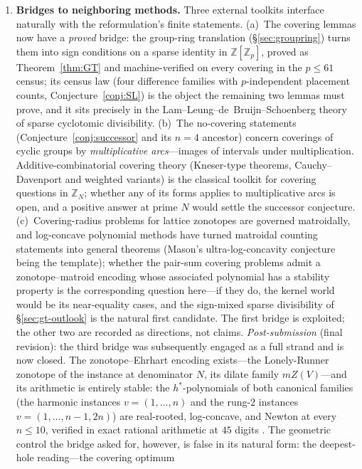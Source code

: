 \documentclass[11pt,a4paper]{article}
\numberwithin{equation}{section}
\theoremstyle{plain}
\theoremstyle{plain}
\theoremstyle{definition}
\theoremstyle{remark}
\newcommand{\Z}{\mathbb{Z}}
\begin{document}
\begin{enumerate}[leftmargin=1.7em,itemsep=4pt]
\item \textbf{Bridges to neighboring methods.} Three external toolkits
  interface naturally with the reformulation's finite statements.
  (a)~The covering lemmas now have a \emph{proved} bridge: the group-ring
  translation (\S\ref{sec:groupring}) turns them into sign conditions on
  a sparse identity in $\Z[\Z_p]$, proved as Theorem~\ref{thm:GT} and
  machine-verified on every covering in the $p\le61$ census; its census
  law (four difference families with $p$-independent placement counts,
  Conjecture~\ref{conj:SL}) is the object the remaining two lemmas must
  prove, and it sits precisely in the Lam--Leung--de~Bruijn--Schoenberg
  theory of sparse cyclotomic divisibility.
  (b)~The no-covering
  statements (Conjecture~\ref{conj:successor} and its $n=4$ ancestor)
  concern coverings of cyclic groups by \emph{multiplicative
  arcs}---images of intervals under multiplication. Additive-combinatorial
  covering theory (Kneser-type theorems, Cauchy--Davenport and weighted
  variants) is the classical toolkit for covering questions in $\Z_N$;
  whether any of its forms applies to multiplicative arcs is open, and a
  positive answer at prime $N$ would settle the successor conjecture.
  (c)~Covering-radius problems for lattice zonotopes are governed
  matroidally, and log-concave polynomial methods have turned matroidal
  counting statements into general theorems (Mason's ultra-log-concavity
  conjecture being the template); whether the pair-sum covering problems
  admit a zonotope--matroid encoding whose associated polynomial has a
  stability property is the corresponding question here---if they do, the
  kernel world would be its near-equality cases, and the sign-mixed
  sparse divisibility of \S\ref{sec:gt-outlook} is the natural first
  candidate. The first bridge is exploited; the other two are recorded as
  directions, not claims. \emph{Post-submission} (final revision): the
  third bridge was subsequently engaged as a full strand and is now
  closed. The zonotope--Ehrhart encoding exists---the Lonely-Runner
  zonotope of the instance at denominator $N$, its dilate family
  $mZ(V)$---and its arithmetic is entirely stable: the $h^*$-polynomials
  of both canonical families (the harmonic instances $v=(1,\dots,n)$ and
  the rung-$2$ instances $v=(1,\dots,n{-}1,2n)$) are real-rooted,
  log-concave, and Newton at every $n\le 10$, verified in exact
  rational arithmetic at $45$ digits \cite{companion-paper}. The
  geometric control the bridge asked for, however, is false in its
  natural form: the deepest-hole reading---the covering optimum

\end{enumerate}
\end{document}
